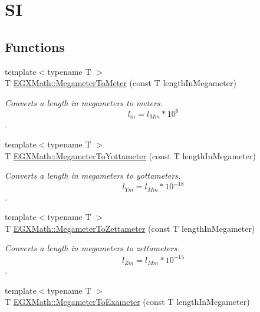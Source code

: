 \hypertarget{group___e_g_x_math-_conversions-_length_conversions-_s_i-_megameter-_s_i}{}\section{SI}
\label{group___e_g_x_math-_conversions-_length_conversions-_s_i-_megameter-_s_i}
\subsection*{Functions}
\begin{DoxyCompactItemize}
\item 
{\footnotesize template$<$typename T $>$ }\\T \mbox{\hyperlink{group___e_g_x_math-_conversions-_length_conversions-_s_i-_megameter-_s_i_gadd3d707010ed78d623f4fbb5b8d72338}{E\+G\+X\+Math\+::\+Megameter\+To\+Meter}} (const T length\+In\+Megameter)
\begin{DoxyCompactList}\small\item\em Converts a length in megameters to meters. \[ l_{m}=l_{Mm} * 10^{6}\]. \end{DoxyCompactList}\item 
{\footnotesize template$<$typename T $>$ }\\T \mbox{\hyperlink{group___e_g_x_math-_conversions-_length_conversions-_s_i-_megameter-_s_i_ga3d729dabc7c37d927c02cf4ae0c560d4}{E\+G\+X\+Math\+::\+Megameter\+To\+Yottameter}} (const T length\+In\+Megameter)
\begin{DoxyCompactList}\small\item\em Converts a length in megameters to yottameters. \[ l_{Ym}=l_{Mm} * 10^{-18} \]. \end{DoxyCompactList}\item 
{\footnotesize template$<$typename T $>$ }\\T \mbox{\hyperlink{group___e_g_x_math-_conversions-_length_conversions-_s_i-_megameter-_s_i_ga3a8765b61b237025a1f8a72a25443cd7}{E\+G\+X\+Math\+::\+Megameter\+To\+Zettameter}} (const T length\+In\+Megameter)
\begin{DoxyCompactList}\small\item\em Converts a length in megameters to zettameters. \[ l_{Zm}=l_{Mm} * 10^{-15} \]. \end{DoxyCompactList}\item 
{\footnotesize template$<$typename T $>$ }\\T \mbox{\hyperlink{group___e_g_x_math-_conversions-_length_conversions-_s_i-_megameter-_s_i_ga30aed22a379d3215a2d660a4219c6936}{E\+G\+X\+Math\+::\+Megameter\+To\+Exameter}} (const T length\+In\+Megameter)

\end{DoxyCompactItemize}

